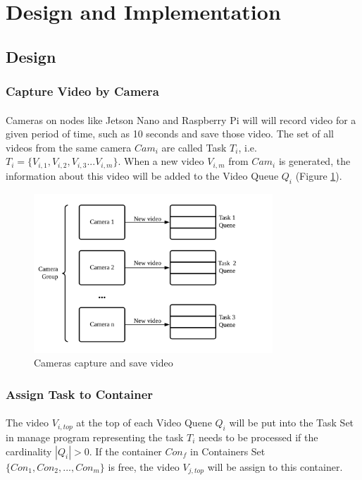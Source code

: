 \documentclass{article}
\begin{document}
    \section{Design and Implementation}
        \subsection{Design}
            \subsubsection{Capture Video by Camera}
                \paragraph{}
                Cameras on nodes like Jetson Nano and Raspberry Pi will will record video for a given period of time, such as 10 seconds and save those video. The set of all videos from the same camera $Cam_i$ are called Task $T _i$, i.e. $T_i=\{V_{i,1},V_{i,2},V_{i,3}...V_{i,m}\}$. When a new video $V_{i,m}$ from $Cam_i$ is generated, the information about this video will be added to the Video Queue $Q_i$ (Figure \ref{img2}).
                \begin{figure}[H]
                    \centering
                    \includegraphics[width=0.8\textwidth]{img/report2.png}
                    \caption{Cameras capture and save video}
                    \label{img2} 
                \end{figure}
            \subsubsection{Assign Task to Container}
                \paragraph{}
                The video $V_{i,top}$ at the top of each Video Quene $Q_i$ will be put into the Task Set in manage program representing the task $T_i$ needs to be processed if the cardinality $|Q_i|>0$.  If the container $Con_f$ in Containers Set $\{Con_1,Con_2,...,Con_m\}$ is free, the video $V_{j,top}$ will be assign to this container.  
\end{document}
